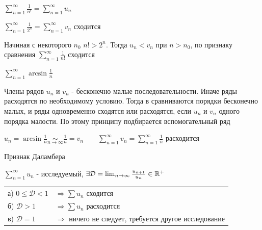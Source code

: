 \documentclass[12pt]{article}
\begin{document}
     $\sum_{n = 1}^\infty \frac{1}{n!} = \sum_{n = 1}^\infty u_n$

    $\sum_{n = 1}^\infty \frac{1}{2^n} = \sum_{n = 1}^\infty v_n$ сходится

    Начиная с некоторого $n_0$ $n! > 2^n$. Тогда $u_n < v_n$ при $n > n_0$, по признаку сравнения $\sum_{n = 1}^\infty \frac{1}{n!}$ сходится


     $\sum_{n = 1}^\infty \arcsin \frac{1}{n}$

    \Nota Члены рядов $u_n$ и $v_n$ - бесконечно малые последовательности. Иначе ряды расходятся по необходимому условию.
    Тогда в  сравниваются порядки бесконечно малых, и ряды одновременно сходятся или расходятся, если $u_n$ и $v_n$ одного
    порядка малости. По этому принципу подбирается вспомогательный ряд

    $u_n = \arcsin \frac{1}{n} \underset{n \to \infty}{\sim} \frac{1}{n} = v_n \quad\quad \sum_{n = 1}^\infty v_n = \sum_{n = 1}^\infty \frac{1}{n}$ расходится

    \begin{MyTheorem}
         Признак Даламбера

        $\sum_{n = 1}^\infty u_n$ - исследуемый, $\exists \mathcal{D} = \lim_{n \to \infty} \frac{u_{n + 1}}{u_n} \in \mathbb{R}^+$

        \begin{tabular}{ll}
            а) $0 \leq \mathcal{D} < 1$ & $\Longrightarrow \sum u_n$ сходится                                \\

            б) $\mathcal{D} > 1$        & $\Longrightarrow \sum u_n$ расходится                              \\

            в) $\mathcal{D} = 1$        & $\Longrightarrow$ ничего не следует, требуется другое исследование \\
        \end{tabular}
    \end{MyTheorem}
\end{document}
